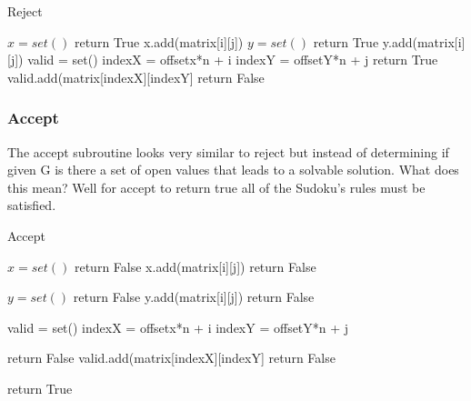 \documentclass{sig-alternate}
\begin{document}
\begin{algorithm}[H]
\caption{Reject}\label{reject}
\begin{algorithmic}[1]
\State $x = set()$
\State return True
\EndIf
\State x.add(matrix[i][j])
\EndIf
\EndFor
\EndFor
{}
\State $y = set()$
\State return True
\EndIf
\State y.add(matrix[i][j])
\EndIf
\EndFor
\EndFor
{}
\State valid = set()
\State indexX = offsetx*n + i
\State indexY = offsetY*n + j
\State return True
\EndIf
\State valid.add(matrix[indexX][indexY]
\EndIf
\EndFor
\EndFor
\EndFor
\EndFor
\State return False
\EndProcedure
\end{algorithmic}
\end{algorithm}

\cite{Backtracking}

\subsubsection{Accept}
The accept subroutine looks very similar to reject but instead of determining if given G is there a set of open values that leads to a solvable solution. What does this mean? Well for accept to return true all of the Sudoku's rules must be satisfied.

\begin{algorithm}[H]
\caption{Accept}\label{accept}
\begin{algorithmic}[1]

\State $x = set()$
\State return False
\EndIf
\State x.add(matrix[i][j])
\Else
\State return False
\EndIf
\EndFor
\EndFor

\State $y = set()$
\State return False
\EndIf
\State y.add(matrix[i][j])
\Else
\State return False
\EndIf
\EndFor
\EndFor

\State valid = set()
\State indexX = offsetx*n + i
\State indexY = offsetY*n + j

\State return False
\EndIf
\State valid.add(matrix[indexX][indexY]
\Else
\State return False
\EndIf
    
\EndFor
\EndFor
\EndFor
\EndFor
\State return True
\EndProcedure
\end{algorithmic}
\end{algorithm}
\cite{Backtracking}
\end{document}
